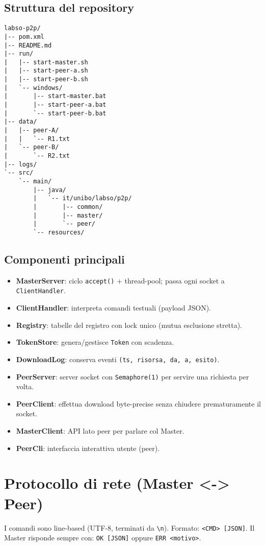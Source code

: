 \documentclass[a4paper,12pt]{article}
\begin{document}
\subsection{Struttura del repository}
\begin{lstlisting}
labso-p2p/
|-- pom.xml
|-- README.md
|-- run/
|   |-- start-master.sh
|   |-- start-peer-a.sh
|   |-- start-peer-b.sh
|   `-- windows/
|       |-- start-master.bat
|       |-- start-peer-a.bat
|       `-- start-peer-b.bat
|-- data/
|   |-- peer-A/
|   |   `-- R1.txt
|   `-- peer-B/
|       `-- R2.txt
|-- logs/
`-- src/
    `-- main/
        |-- java/
        |   `-- it/unibo/labso/p2p/
        |       |-- common/
        |       |-- master/
        |       `-- peer/
        `-- resources/
\end{lstlisting}

\subsection{Componenti principali}
\begin{itemize}
  \item \textbf{MasterServer}: ciclo \texttt{accept()} + thread-pool; passa ogni socket a \texttt{ClientHandler}.
  \item \textbf{ClientHandler}: interpreta comandi testuali (payload JSON).
  \item \textbf{Registry}: tabelle del registro con lock unico (mutua esclusione stretta).
  \item \textbf{TokenStore}: genera/gestisce \texttt{Token} con scadenza.
  \item \textbf{DownloadLog}: conserva eventi \texttt{(ts, risorsa, da, a, esito)}.
  \item \textbf{PeerServer}: server socket con \texttt{Semaphore(1)} per servire una richiesta per volta.
  \item \textbf{PeerClient}: effettua download byte-precise senza chiudere prematuramente il socket.
  \item \textbf{MasterClient}: API lato peer per parlare col Master.
  \item \textbf{PeerCli}: interfaccia interattiva utente (peer).
\end{itemize}

\section{Protocollo di rete (Master <-> Peer)}
I comandi sono line-based (UTF-8, terminati da \verb|\n|). Formato: \texttt{<CMD> [JSON]}.  
Il Master risponde sempre con: \texttt{OK [JSON]} oppure \texttt{ERR <motivo>}.
\end{document}
